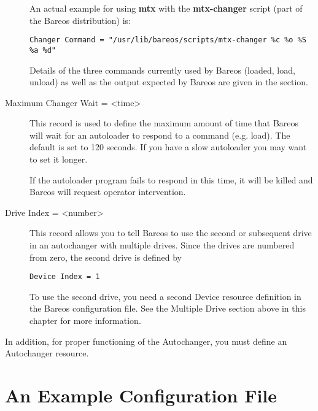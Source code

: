 \begin{description}
An actual example for using {\bf mtx} with the  {\bf mtx-changer} script (part
of the Bareos distribution) is:

\footnotesize
\begin{verbatim}
Changer Command = "/usr/lib/bareos/scripts/mtx-changer %c %o %S %a %d"
\end{verbatim}
\normalsize

Details of the three
commands currently used by Bareos  (loaded, load, unload) as well as the
output expected by  Bareos are given in the  section.

\item [Maximum Changer Wait = {\textless}time{\textgreater}]
   This record is used to define the maximum amount of time that Bareos
   will wait for an autoloader to respond to a command (e.g.  load).  The
   default is set to 120 seconds.  If you have a slow autoloader you may
   want to set it longer.

If the autoloader program fails to respond in this time, it  will be killed
and Bareos will request operator intervention.

\item [Drive Index = {\textless}number{\textgreater}]
   This record allows you to tell Bareos to use the second or subsequent
   drive in an autochanger with multiple drives.  Since the drives are
   numbered from zero, the second drive is defined by

\footnotesize
\begin{verbatim}
Device Index = 1

\end{verbatim}
\normalsize

To use the second drive, you need a second Device resource definition  in the
Bareos configuration file. See the Multiple Drive section above  in this
chapter for more information.
\end{description}

In addition, for proper functioning of the Autochanger, you must
define an Autochanger resource.

\label{example}
\section{An Example Configuration File}

